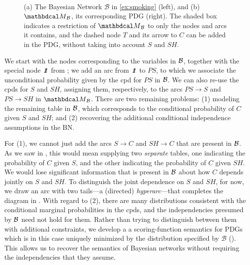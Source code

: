 \begin{example}[emulating a BN]
\begin{figure}[ht!]
\fi
	\hfill~
	\label{subfig:smoking-pdg}
\addtocounter{figure}{-1}
\caption[The classic ``smoking'' BN, its corresponding PDG, and a restriction of
    the latter, which can be augmented with other information about cancer.
]{ (a) The Bayesian Network $\mathcal B$ in \cref{ex:smoking} (left), and
(b) $\PDGof{\mathcal B}$, its corresponding PDG (right). The shaded box
indicates a restriction of $\PDGof{\mathcal B}$ to only the nodes and arcs it
contains, and the dashed node $T$ and its arrow to $C$ can be added in the PDG,
without taking into account $S$ and $SH$.}
\label{fig:smoking-bn+pdg}
\end{figure}

We start with the nodes corresponding to the variables in $\cal B$, together
with the special node $\pdgunit$ from ; we add an arc
from ${\pdgunit}$ to $\mathit{PS}$, to which we associate the unconditional
probability given by the cpd for $\mathit{PS}$ in $\cal B$. We can also re-use
the cpds for $S$ and $\mathit{SH}$, assigning them, respectively, to the arcs
$PS \to S$ and $PS \to SH$ in $\PDGof{{\mathcal B}}$.
There are two remaining problems: (1) modeling the remaining table in $\cal B$,
which corresponds to the conditional probability of $C$ given $S$ and $SH$; and
(2) recovering the additional
conditional
independence assumptions in the BN. 

For (1), we cannot just add the arcs $S \to C$ and $SH \to C$ that are present
in $\cal B$. As we saw in , this would mean
supplying two \emph{separate} tables, one indicating the probability of $C$
given $S$, and the other indicating the probability of $C$ given
$\mathit{SH}$.  We would lose significant information that is
present in $\cal B$  about 
how $C$ depends jointly on $S$ and $SH$. To distinguish the joint dependence on
$S$ and $\mathit{SH}$, for now, we draw an arc with two tails---a
(directed)
\emph{hyperarc}---that completes the diagram in . 
With regard to (2), there are many distributions consistent with the conditional
marginal probabilities in the cpds, and the independencies presumed by $\cal B$
need not hold for them. 
Rather than trying to distinguish between them with additional constraints,
we develop a a scoring-function semantics for PDGs
which 
is in this case uniquely minimized by the distribution 
specified by ${\mathcal B}$ ().
This allows us to recover the semantics of Bayesian networks without requiring the independencies that they assume.


\end{example}
